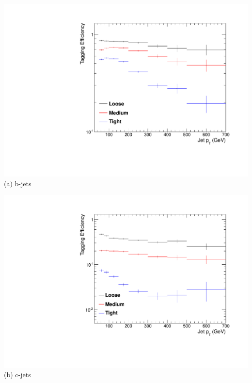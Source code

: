 \begin{minipage}{\textwidth}
\centering
\begin{minipage}[b]{0.48\linewidth}
\includegraphics[width = 1.0\linewidth]{plots/bjet_PtDistribution_Htbin_Template_375.pdf}
\centering (a)  b-jets
\end{minipage}
\quad
\begin{minipage}[b]{0.48\linewidth}
\includegraphics[width = 1.0\linewidth]{plots/cjet_PtDistribution_Htbin_Template_375.pdf}
\centering (b) c-jets
\end{minipage}
\end{minipage}
\quad

